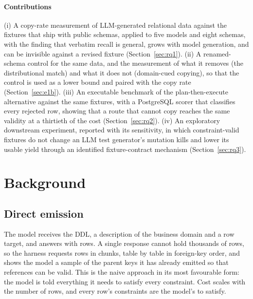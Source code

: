 \documentclass[preprint,12pt]{elsarticle}
\begin{document}
\paragraph{Contributions}
(i) A copy-rate measurement of LLM-generated relational data against the fixtures that ship with public schemas, applied to five models and eight schemas, with the finding that verbatim recall is general, grows with model generation, and can be invisible against a revised fixture (Section~\ref{sec:rq1}).
(ii) A renamed-schema control for the same data, and the measurement of what it removes (the distributional match) and what it does not (domain-cued copying), so that the control is used as a lower bound and paired with the copy rate (Section~\ref{sec:e1b}).
(iii) An executable benchmark of the plan-then-execute alternative against the same fixtures, with a PostgreSQL scorer that classifies every rejected row, showing that a route that cannot copy reaches the same validity at a thirtieth of the cost (Section~\ref{sec:rq2}).
(iv) An exploratory downstream experiment, reported with its sensitivity, in which constraint-valid fixtures do not change an LLM test generator's mutation kills and lower its usable yield through an identified fixture-contract mechanism (Section~\ref{sec:rq3}).

\section{Background}
\label{sec:background}

\subsection{Direct emission}
The model receives the DDL, a description of the business domain and a row target, and answers with rows. A single response cannot hold thousands of rows, so the harness requests rows in chunks, table by table in foreign-key order, and shows the model a sample of the parent keys it has already emitted so that references can be valid. This is the naive approach in its most favourable form: the model is told everything it needs to satisfy every constraint. Cost scales with the number of rows, and every row's constraints are the model's to satisfy.
\end{document}

